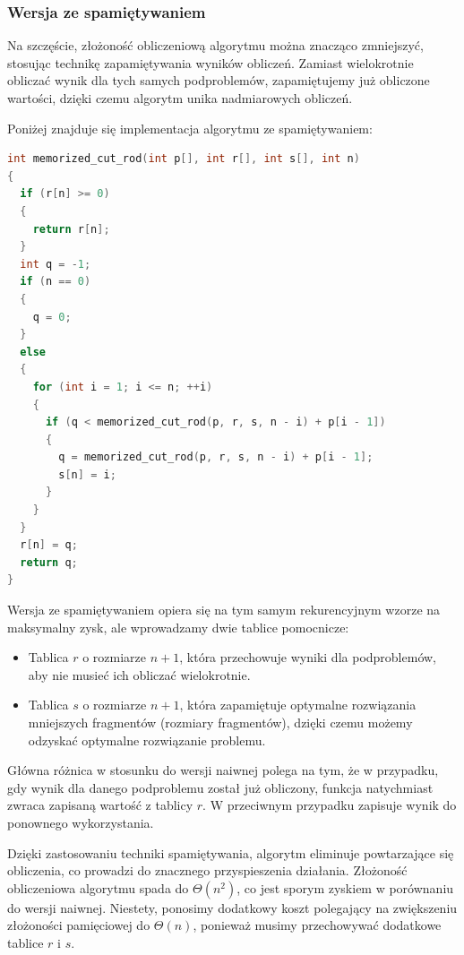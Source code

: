 \documentclass{article}
\begin{document}
\subsubsection{Wersja ze spamiętywaniem}
Na szczęście, złożoność obliczeniową algorytmu można znacząco zmniejszyć, stosując technikę zapamiętywania wyników obliczeń. Zamiast wielokrotnie obliczać wynik dla tych samych podproblemów, zapamiętujemy już obliczone wartości, dzięki czemu algorytm unika nadmiarowych obliczeń.

Poniżej znajduje się implementacja algorytmu ze spamiętywaniem:
\begin{lstlisting}[style=mystyle, language=C++, caption={Implementacja \texttt{memorized\_cut\_rod}}, label={lst:memorized_cut_rod}]
int memorized_cut_rod(int p[], int r[], int s[], int n)
{
  if (r[n] >= 0)
  {
    return r[n];
  }
  int q = -1;
  if (n == 0)
  {
    q = 0;
  }
  else
  {
    for (int i = 1; i <= n; ++i)
    {
      if (q < memorized_cut_rod(p, r, s, n - i) + p[i - 1])
      {
        q = memorized_cut_rod(p, r, s, n - i) + p[i - 1];
        s[n] = i;
      }
    }
  }
  r[n] = q;
  return q;
}
\end{lstlisting}

Wersja ze spamiętywaniem opiera się na tym samym rekurencyjnym wzorze na maksymalny zysk, ale wprowadzamy dwie tablice pomocnicze:
\begin{itemize}
    \item Tablica $r$ o rozmiarze $n+1$, która przechowuje wyniki dla podproblemów, aby nie musieć ich obliczać wielokrotnie.
    \item Tablica $s$ o rozmiarze $n+1$, która zapamiętuje optymalne rozwiązania mniejszych fragmentów (rozmiary fragmentów), dzięki czemu możemy odzyskać optymalne rozwiązanie problemu.
\end{itemize}
Główna różnica w stosunku do wersji naiwnej polega na tym, że w przypadku, gdy wynik dla danego podproblemu został już obliczony, funkcja natychmiast zwraca zapisaną wartość z tablicy $r$. W przeciwnym przypadku zapisuje wynik do ponownego wykorzystania.

Dzięki zastosowaniu techniki spamiętywania, algorytm eliminuje powtarzające się obliczenia, co prowadzi do znacznego przyspieszenia działania. Złożoność obliczeniowa algorytmu spada do $\Theta (n^2)$, co jest sporym zyskiem w porównaniu do wersji naiwnej. Niestety, ponosimy dodatkowy koszt polegający na zwiększeniu złożoności pamięciowej do $\Theta (n)$, ponieważ musimy przechowywać dodatkowe tablice $r$ i $s$.
\end{document}
